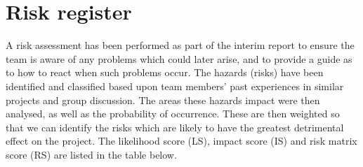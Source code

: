\section{Risk register}
\label{sec:riskregister}

A risk assessment has been performed as part of the interim
report to ensure the team is aware of any problems which could later
arise, and to provide a guide as to how to react when such problems
occur. The hazards (risks) have been identified and classified based
upon team members' past experiences in similar projects and group
discussion. The areas these hazards impact were then analysed, as well
as the probability of occurrence. These are then weighted so that we
can identify the risks which are likely to have the greatest
detrimental effect on the project. The likelihood score (LS), impact
score (IS) and risk matrix score (RS) are listed in the table below.

